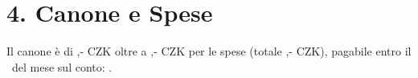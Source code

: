 \section*{4. Canone e Spese}
Il canone è di \Rentrentamount,- CZK oltre a \Rentservicesamount,- CZK per le spese (totale \Renttotalamount,- CZK), pagabile entro il \Rentpaymentday\ del mese sul conto: \Rentbankaccount.
